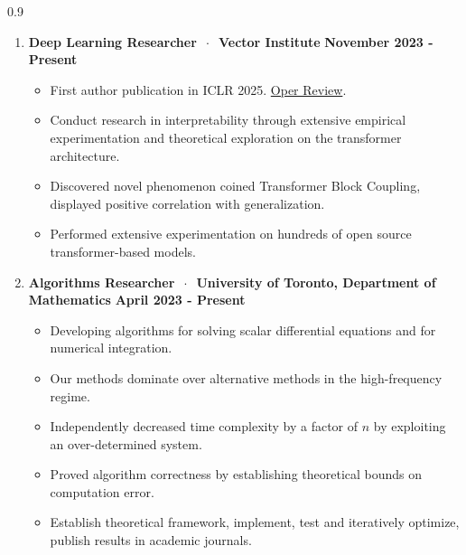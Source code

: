 \documentclass{article}
\begin{document}
\begin{spacing}{0.9}
\begin{enumerate}[itemsep=0.1em, parsep=0.1em, topsep=0.1em]
    \item \textbf{Deep Learning Researcher} $ \ \cdot \ $ \small{\textbf{Vector Institute}} \hspace{\fill} \textbf{November 2023 - Present}\\
    \small{ 
        \begin{itemize}[itemsep=0.1pt,parsep=0.2pt, topsep=0.1pt]
            \item First author publication in ICLR 2025. \href{https://openreview.net/forum?id=kvLenbZZgg&referrer=%5Bthe%20profile%20of%20Murdock%20Aubry%5D(%2Fprofile%3Fid%3D~Murdock_Aubry1)}{\color{blue}Oper Review}.
            \item Conduct research in interpretability through extensive empirical experimentation and theoretical exploration on the transformer architecture.
            \item Discovered novel phenomenon coined Transformer Block Coupling, displayed positive correlation with generalization.
            \item Performed extensive experimentation on hundreds of open source transformer-based models. 
        \end{itemize}
    }
    \normalsize


    \item \textbf{Algorithms Researcher} $ \ \cdot \ $ \small{\textbf{University of Toronto, Department of Mathematics}} \hspace{\fill} \textbf{April 2023 - Present}\\
    \small{ 
        \begin{itemize}[itemsep=0.1pt,parsep=0.1pt, topsep=0.1pt]
            \item Developing algorithms for solving scalar differential equations and for numerical integration.
            \item Our methods dominate over alternative methods in the high-frequency regime.
            \item Independently decreased time complexity by a factor of $n$ by exploiting an over-determined system.
            \item Proved algorithm correctness by establishing theoretical bounds on computation error. 
            \item Establish theoretical framework, implement, test and iteratively optimize, publish results in academic journals.
        \end{itemize}
    }
    \normalsize



\end{enumerate}
\end{spacing}
\end{document}
